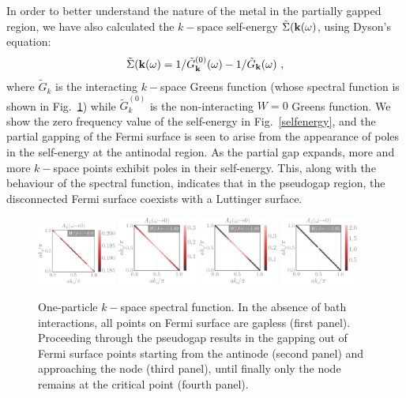\documentclass[reprint,hidelinks,onecolumn]{revtex4-2}
\begin{document}
In order to better understand the nature of the metal in the partially gapped region, we have also calculated the \(k-\)space self-energy \(\tilde \Sigma({\bf k}(\omega)\), using Dyson's equation:
\begin{equation}\begin{aligned}
	\tilde \Sigma({\bf k}(\omega) = 1/\tilde G^{(0)}_{\bf k}(\omega) - 1/\tilde G_{\bf k}(\omega)~,
\end{aligned}\end{equation}
where \(\tilde G_k\) is the interacting \(k-\)space Greens function (whose spectral function is shown in Fig.~\ref{tiledSpecFunc}) while \(\tilde G_k^{(0)}\) is the non-interacting \(W=0\) Greens function. We show the zero frequency value of the self-energy in Fig.~\ref{selfenergy}, and the partial gapping of the Fermi surface is seen to arise from the appearance of poles in the self-energy at the antinodal region. As the partial gap expands, more and more \(k-\)space points exhibit poles in their self-energy. This, along with the behaviour of the spectral function, indicates that in the pseudogap region, the disconnected Fermi surface coexists with a Luttinger surface.
\begin{figure}[htpb]
	\centering
	\includegraphics[width=0.23\textwidth]{kspaceDOS-1.pdf}
	\includegraphics[width=0.23\textwidth]{kspaceDOS-2.pdf}
	\includegraphics[width=0.23\textwidth]{kspaceDOS-3.pdf}
	\includegraphics[width=0.23\textwidth]{kspaceDOS-4.pdf}
	\caption{One-particle \(k-\)space spectral function. In the absence of bath interactions, all points on Fermi surface are gapless (first panel). Proceeding through the pseudogap results in the gapping out of Fermi surface points starting from the antinode (second panel) and approaching the node (third panel), until finally only the node remains at the critical point (fourth panel).}
	\label{tiledSpecFunc}
\end{figure}
\end{document}
